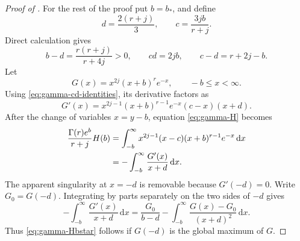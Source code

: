 \documentclass[11pt]{article}
\newcommand{\dd}{\,\mathrm d}
\begin{document}
\begin{proof}[Proof of ]
For the rest of the proof put \(b=b_*\), and define
\begin{equation}\label{eq:gamma-cd}
       d=\frac{2(r+j)}3,
       \qquad
       c=\frac{3jb}{r+j}.
\end{equation}
Direct calculation gives
\begin{equation}\label{eq:gamma-cd-identities}
 b-d=\frac{r(r+j)}{r+4j}>0,
 \qquad cd=2jb,
 \qquad c-d=r+2j-b.
\end{equation}
Let
\begin{equation}\label{eq:gamma-G}
       G(x)=x^{2j}(x+b)^re^{-x},
       \qquad -b\le x<\infty.
\end{equation}
Using \eqref{eq:gamma-cd-identities}, its derivative factors as
\begin{equation}\label{eq:gamma-Gprime}
 G'(x)=x^{2j-1}(x+b)^{r-1}e^{-x}(c-x)(x+d).
\end{equation}
After the change of variables \(x=y-b\), equation
\eqref{eq:gamma-H} becomes
\begin{align}
 \frac{\Gamma(r)e^b}{r+j}H(b)
 &=\int_{-b}^{\infty}
   x^{2j-1}(x-c)(x+b)^{r-1}e^{-x}\dd x\notag\\
 &=-\int_{-b}^{\infty}\frac{G'(x)}{x+d}\dd x.
 \label{eq:gamma-H-integral}
\end{align}
The apparent singularity at \(x=-d\) is removable because
\(G'(-d)=0\).  Write \(G_0=G(-d)\).  Integrating by parts separately on
the two sides of \(-d\) gives
\begin{equation}\label{eq:gamma-ibp-max}
 -\int_{-b}^{\infty}\frac{G'(x)}{x+d}\dd x
 =\frac{G_0}{b-d}
  -\int_{-b}^{\infty}\frac{G(x)-G_0}{(x+d)^2}\dd x.
\end{equation}
Thus \eqref{eq:gamma-Hbstar} follows if \(G(-d)\) is the global maximum of
\(G\).


\end{proof}
\end{document}
